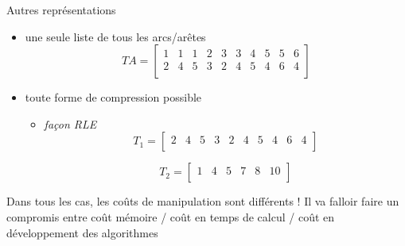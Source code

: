\begin{frame}{Autres représentations}
    \begin{itemize}
        \item une seule liste de tous les arcs/arêtes 
        \begin{equation*}
            TA = \left[
              \begin{array}{cccccccccc}
              1 & 1 & 1 & 2 & 3 & 3 & 4 & 5 & 5 & 6 \\
              2 & 4 & 5 & 3 & 2 & 4 & 5 & 4 & 6 & 4 \\
              \end{array}
              \right]
          \end{equation*}          
        \item toute forme de compression possible 
        \begin{itemize}
            \item \textit{façon RLE}
            \begin{equation*}
                T_1 = \left[
                  \begin{array}{cccccccccc}
                  2 & 4 & 5 & 3 & 2 & 4 & 5 & 4 & 6 & 4 \\
                  \end{array}
                  \right]
              \end{equation*}
              
              \begin{equation*}
                T_2 = \left[
                  \begin{array}{cccccc}
                   1 & 4 & 5 & 7 & 8 & 10 \\
                  \end{array}
                  \right]
              \end{equation*}
              
        \end{itemize}
    \end{itemize}
    \pause 
    \alert{Dans tous les cas, les coûts de manipulation sont différents ! Il va falloir faire un compromis entre coût mémoire / coût en temps de calcul / coût en développement des algorithmes}
\end{frame}


